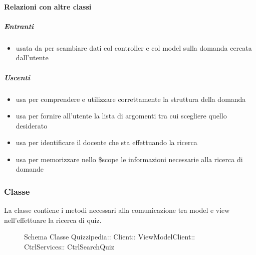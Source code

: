 \paragraph{Relazioni con altre classi}
\subparagraph{Entranti}
\begin{itemize}
\item usata da  per scambiare dati col controller e col model sulla domanda cercata dall'utente
\end{itemize}
\subparagraph{Uscenti}
\begin{itemize}
\item usa  per comprendere e utilizzare correttamente la struttura della domanda
\item usa  per fornire all'utente la lista di argomenti tra cui scegliere quello desiderato
\item usa  per identificare il docente che sta effettuando la ricerca
\item usa  per memorizzare nello \$scope le informazioni necessarie alla ricerca di domande
\end{itemize}
\subsubsection{Classe }
La classe contiene i metodi necessari alla comunicazione tra model e view nell'effettuare la ricerca di quiz.
\begin{figure}[H]
\centering
\noindent{}
\caption[Schema Classe CtrlSearchQuiz]{Schema Classe Quizzipedia:: Client:: ViewModelClient:: CtrlServices:: CtrlSearchQuiz}
\end{figure}
